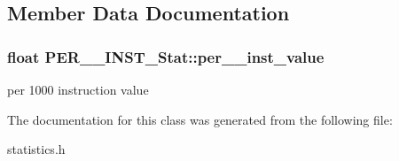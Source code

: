 \subsection{Member Data Documentation}
\hypertarget{classPER__1000__INST__Stat_a10fee97cef42d33172c4fc2f63bc7a71}{
\subsubsection[{per\_\-1000\_\-inst\_\-value}]{\setlength{\rightskip}{0pt plus 5cm}float {\bf PER\_\_\-INST\_\-Stat::per\_\_\-inst\_\-value}}}
\label{classPER__1000__INST__Stat_a10fee97cef42d33172c4fc2f63bc7a71}
per 1000 instruction value 

The documentation for this class was generated from the following file:\begin{DoxyCompactItemize}
\item 
statistics.h\end{DoxyCompactItemize}
